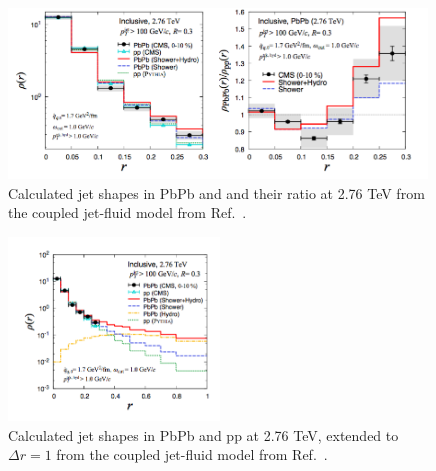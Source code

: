 \begin{figure}[ht!]
\begin{center}
\includegraphics[width=0.99\textwidth]{figures/Models/JetFluid_JetShape.png}
\caption[Calculated jet shapes in PbPb and pp and their ratio at 2.76 TeV from the coupled jet-fluid model]{Calculated jet shapes in PbPb and and their ratio at 2.76 TeV from the coupled jet-fluid model from Ref.~\cite{Tachibana:2017syd}.}
\label{fig:jet_fluid_jet_shape}
\end{center}
\end{figure}

\begin{figure}[ht!]
\begin{center}
\includegraphics[width=0.5\textwidth]{figures/Models/JetFluid_JetShapes2.png}
\caption[Calculated jet shapes in PbPb and pp at 2.76 TeV from the coupled jet-fluid model, extended to $\Delta r = 1$]{Calculated jet shapes in PbPb and pp at 2.76 TeV, extended to $\Delta r = 1$ from the coupled jet-fluid model from Ref.~\cite{Tachibana:2017syd}.}
\label{fig:jet_fluid_jet_shape2}
\end{center}
\end{figure}

